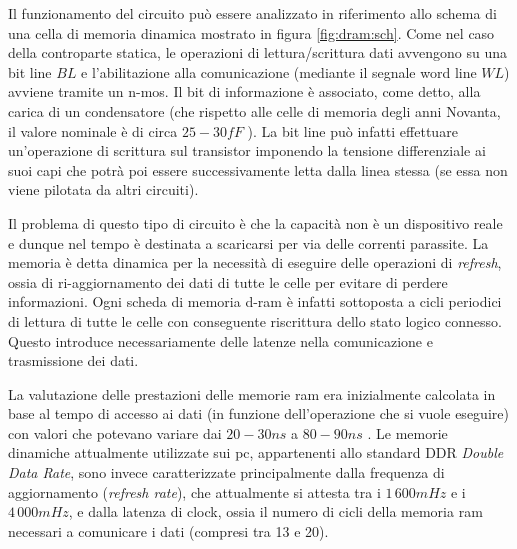	Il funzionamento del circuito può essere analizzato in riferimento allo schema di una cella di memoria dinamica mostrato in figura \ref{fig:dram:sch}. Come nel caso della controparte statica, le operazioni di lettura/scrittura dati avvengono su una bit line $BL$ e l'abilitazione alla comunicazione (mediante il segnale word line $WL$) avviene tramite un n-mos. Il bit di informazione è associato, come detto, alla carica di un condensatore (che rispetto alle celle di memoria degli anni Novanta, il valore nominale è di circa $25-30fF$ \cite{raminfo}). La bit line può infatti effettuare un'operazione di scrittura sul transistor imponendo la tensione differenziale ai suoi capi che potrà poi essere successivamente letta dalla linea stessa (se essa non viene pilotata da altri circuiti).
	
	Il problema di questo tipo di circuito è che la capacità non è un dispositivo reale e dunque nel tempo è destinata a scaricarsi per via delle correnti parassite. La memoria è detta dinamica per la necessità di eseguire delle operazioni di \textit{refresh}, ossia di ri-aggiornamento dei dati di tutte le celle per evitare di perdere informazioni. Ogni scheda di memoria d-ram è infatti sottoposta a cicli periodici di lettura di tutte le celle con conseguente riscrittura dello stato logico connesso. Questo introduce necessariamente delle latenze nella comunicazione e trasmissione dei dati.
	
	La valutazione delle prestazioni delle memorie ram era inizialmente calcolata in base al tempo di accesso ai dati (in funzione dell'operazione che si vuole eseguire) con valori che potevano variare dai $20-30ns$ a $80-90ns$ \cite{raminfo}. Le memorie dinamiche attualmente utilizzate sui pc, appartenenti allo standard DDR \textit{Double Data Rate}, sono invece caratterizzate principalmente dalla frequenza di aggiornamento (\textit{refresh rate}), che attualmente si attesta tra i $1\,600 mHz$ e i $4\,000 mHz$, e dalla latenza di clock, ossia il numero di cicli della memoria ram necessari a comunicare i dati (compresi tra 13 e 20).



